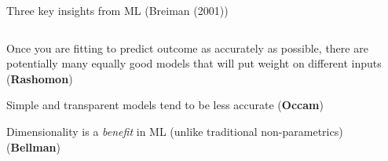 \documentclass[notes,11pt, aspectratio=169]{beamer}
\newenvironment{wideitemize}{\itemize\addtolength{\itemsep}{10pt}}{\enditemize}
\begin{document}
\begin{frame}{Three key insights from ML (Breiman (2001))}
  \begin{columns}[onlytextwidth, T] %
    \begin{column}{.5\textwidth}
  \begin{wideitemize}
  \item<1-> Once you are fitting to predict outcome as accurately as
    possible, there are potentially many equally good models that will put weight on different inputs
    (\textbf{Rashomon})
  \item<2-> Simple and transparent models tend to be less accurate (\textbf{Occam})
  \item<3-> Dimensionality is a \emph{benefit} in ML (unlike traditional non-parametrics) (\textbf{Bellman})
  \end{wideitemize}
      \end{column}%
      \hfill%
      \begin{column}{.4\textwidth}

\end{column}
\end{columns}
\end{frame}
\end{document}

